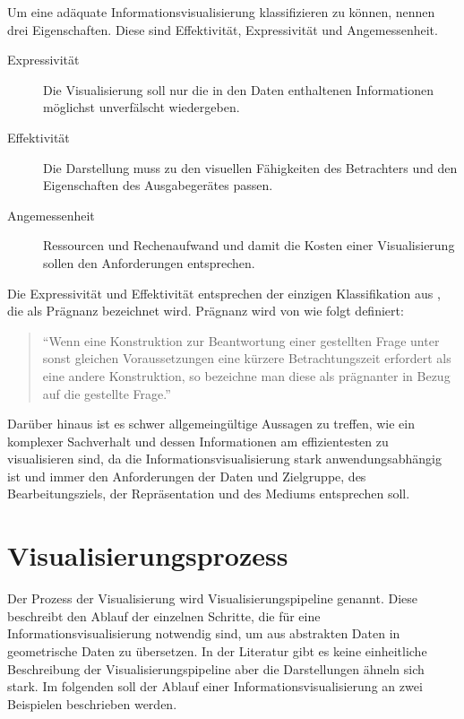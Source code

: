 \documentclass[a4paper, 12pt, DIVcalc, onepage, pdftex, headsepline, footsepline]{scrreprt}
\begin{document}
Um eine adäquate Informationsvisualisierung klassifizieren zu können, nennen \citep{Schumann} drei Eigenschaften.
Diese sind Effektivität, Expressivität und Angemessenheit.
\begin{description}
\item[Expressivität]
Die Visualisierung soll nur die in den Daten enthaltenen Informationen möglichst unverfälscht wiedergeben.
\item[Effektivität]
Die Darstellung muss zu den visuellen Fähigkeiten des Betrachters und den Eigenschaften des Ausgabegerätes
passen.
\item[Angemessenheit]
Ressourcen und Rechenaufwand und damit die Kosten einer Visualisierung sollen den Anforderungen entsprechen.
\end{description}
Die Expressivität und Effektivität entsprechen der einzigen Klassifikation aus \citep{Bertin}, die als Prägnanz bezeichnet wird.
Prägnanz wird von \citep[S.\,17]{Bertin} wie folgt definiert:
\begin{quote}
"`Wenn eine Konstruktion zur Beantwortung einer gestellten Frage unter sonst gleichen Voraussetzungen eine
kürzere Betrachtungszeit erfordert als eine andere Konstruktion, so bezeichne man diese als prägnanter in
Bezug auf die gestellte Frage."'
\end{quote}
Darüber hinaus ist es schwer allgemeingültige Aussagen zu treffen, wie ein komplexer Sachverhalt und dessen
Informationen am effizientesten zu visualisieren sind, da die Informationsvisualisierung stark anwendungsabhängig ist und
immer den Anforderungen der Daten und Zielgruppe, des Bearbeitungsziels, der Repräsentation und des Mediums entsprechen soll.

\section{Visualisierungsprozess}
\label{sec:Pipeline}
Der Prozess der Visualisierung wird Visualisierungspipeline genannt. Diese beschreibt den Ablauf der einzelnen
Schritte, die für eine Informationsvisualisierung notwendig sind, um aus abstrakten Daten in geometrische Daten
zu übersetzen. In der Literatur gibt es keine einheitliche Beschreibung der Visualisierungspipeline aber
die Darstellungen ähneln sich stark. Im folgenden soll der Ablauf einer Informationsvisualisierung an zwei Beispielen
beschrieben werden.
\end{document}
